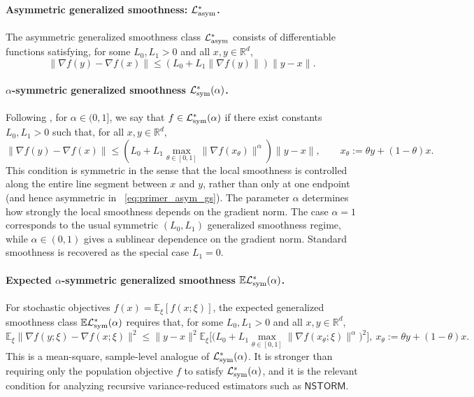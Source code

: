 \documentclass[letter,11pt]{article}
\newcommand{\E}{\mathbb{E}}
\newcommand{\R}{\mathbb{R}}
\newcommand{\Lcal}{\mathcal{L}}
\begin{document}
\paragraph{Asymmetric generalized smoothness: $\Lcal_{\rm asym}^*$.}
The asymmetric generalized smoothness class $\Lcal_{\rm asym}^*$ consists of differentiable functions satisfying, for some $L_0,L_1>0$ and all $x,y\in\R^d$,
\begin{equation}
    \label{eq:primer_asym_gs}
    \|\nabla f(y)-\nabla f(x)\|
    \le
    \left(L_0+L_1\|\nabla f(y)\|\right)\|y-x\|.
\end{equation}

\paragraph{$\alpha$-symmetric generalized smoothness $\Lcal_{\rm sym}^*(\alpha)$.}
Following \citet{chen2023generalized}, for $\alpha\in(0,1]$, we say that $f\in\Lcal_{\rm sym}^*(\alpha)$ if there exist constants $L_0,L_1>0$ such that, for all $x,y\in\R^d$,
\begin{equation}
    \label{eq:primer_sym_gs}
    \|\nabla f(y)-\nabla f(x)\| \le \left( L_0 + L_1 \max_{\theta\in[0,1]} \|\nabla f(x_\theta)\|^\alpha \right) \|y-x\|,
    \qquad
    x_\theta:=\theta y+(1-\theta)x.
\end{equation}
This condition is symmetric in the sense that the local smoothness is controlled along the entire line segment between $x$ and $y$, rather than only at one endpoint (and hence asymmetric in ~\ref{eq:primer_asym_gs}). The parameter $\alpha$ determines how strongly the local smoothness depends on the gradient norm. The case $\alpha=1$ corresponds to the usual symmetric $(L_0,L_1)$ generalized smoothness regime, while $\alpha\in(0,1)$ gives a sublinear dependence on the gradient norm. Standard smoothness is recovered as the special case $L_1=0$.

\paragraph{Expected $\alpha$-symmetric generalized smoothness $\E\Lcal_{\rm sym}^*(\alpha)$.}
For stochastic objectives $f(x)=\E_\xi[f(x;\xi)]$, the expected generalized smoothness class $\E\Lcal_{\rm sym}^*(\alpha)$ requires that, for some $L_0,L_1>0$ and all $x,y\in\R^d$,
\begin{equation}
    \label{eq:primer_expected_sym_gs}
    \E_\xi \big\| \nabla f(y;\xi)-\nabla f(x;\xi) \big\|^2 \le \|y-x\|^2 \E_\xi \Big[ \big( L_0 + L_1 \max_{\theta\in[0,1]} \|\nabla f(x_\theta;\xi)\|^\alpha \big)^2 \Big],
    \
    x_\theta:=\theta y+(1-\theta)x.
\end{equation}
This is a mean-square, sample-level analogue of $\Lcal_{\rm sym}^*(\alpha)$. It is stronger than requiring only the population objective $f$ to satisfy $\Lcal_{\rm sym}^*(\alpha)$, and it is the relevant condition for analyzing recursive variance-reduced estimators such as $\mathsf{NSTORM}$.
\end{document}
